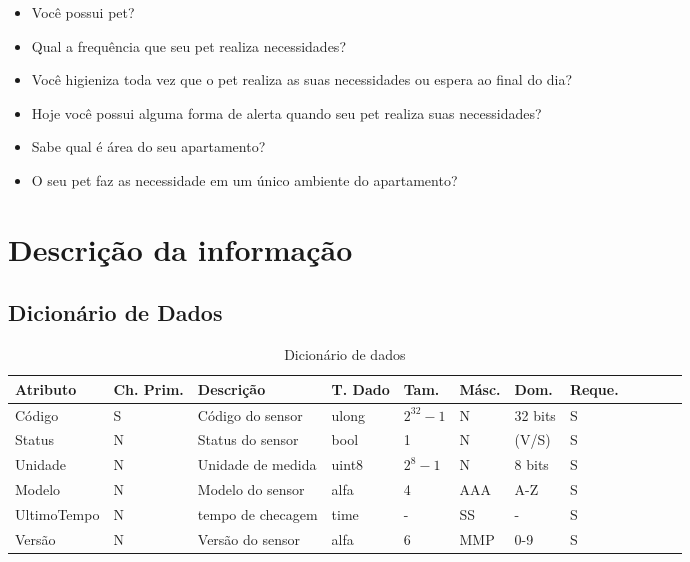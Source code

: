 \documentclass[12pt,a4paper]{article}
\let\oldsection\section
\renewcommand\section{\clearpage\oldsection}
\begin{document}
\begin{itemize}
	\item Você possui pet?
	\item Qual a frequência que seu pet realiza necessidades?
	\item Você higieniza toda vez que o pet realiza as suas necessidades ou espera
		ao final do dia?
	\item Hoje você possui alguma forma de alerta quando seu pet realiza suas
		necessidades?
	\item Sabe qual é área do seu apartamento?
	\item O seu pet faz as necessidade em um único ambiente do apartamento?
\end{itemize}

\section{Descrição da informação}

\subsection{Dicionário de Dados}


\begin{table}[h!]
	\begin{tabularx}{\textwidth}{|l|X|l|X|l|X|l|X|l|l|l|l|}
	\hline
	Atributo & Ch. Prim. & Descrição & T. Dado & Tam. & Másc. & Dom. & Reque.\\
	\hline
		Código & S & Código do sensor & \gls{ulong} & $2^{32} - 1$ & N & 32 bits & S \\
		Status & N & Status do sensor & \gls{bool} & 1 & N & (V/S) & S \\
		Unidade & N & Unidade de medida & \gls{uint8} & $2^8 - 1$ & N & 8 bits & S \\
		Modelo & N & Modelo do sensor & \gls{alfa} & 4 & AAA & A-Z & S \\
	UltimoTempo & N & tempo de checagem & time & - & SS & - & S \\
		Versão & N & Versão do sensor & \gls{alfa} & 6 & MMP & 0-9 & S \\
	\hline
	\end{tabularx}
	\caption{Dicionário de dados}
	\label{table:1}
\end{table}
\end{document}
